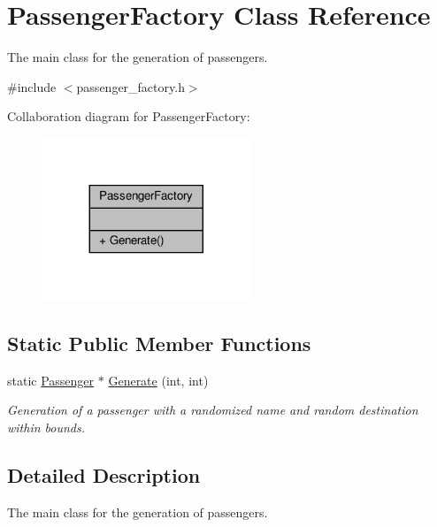 \hypertarget{classPassengerFactory}{}\section{Passenger\+Factory Class Reference}
\label{classPassengerFactory}


The main class for the generation of passengers.  




{\ttfamily \#include $<$passenger\+\_\+factory.\+h$>$}



Collaboration diagram for Passenger\+Factory\+:\nopagebreak
\begin{figure}[H]
\begin{center}
\leavevmode
\includegraphics[width=176pt]{classPassengerFactory__coll__graph}
\end{center}
\end{figure}
\subsection*{Static Public Member Functions}
\begin{DoxyCompactItemize}
\item 
static \hyperlink{classPassenger}{Passenger} $\ast$ \hyperlink{classPassengerFactory_a2952ba78ceb285f445bc768d287230d2}{Generate} (int, int)
\begin{DoxyCompactList}\small\item\em Generation of a passenger with a randomized name and random destination within bounds. \end{DoxyCompactList}\end{DoxyCompactItemize}


\subsection{Detailed Description}
The main class for the generation of passengers. 

